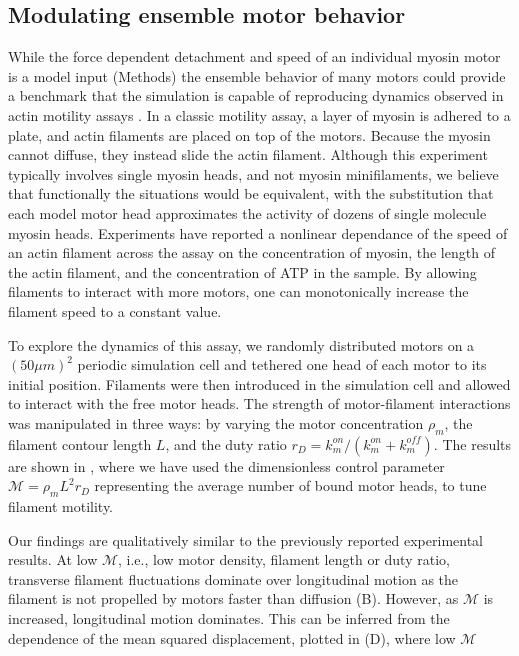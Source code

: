 \documentclass[12pt]{article}
\begin{document}
\subsection{Modulating ensemble motor behavior}
While the force dependent detachment and speed of an individual myosin motor is
a model input (Methods) the ensemble behavior of many motors could provide
a benchmark that the simulation is capable of reproducing dynamics observed in 
actin motility assays \cite{riveline1998, walcott2012}. In a classic motility
assay, a layer of myosin is adhered to a plate, and actin filaments
are placed on top of the motors. Because the myosin cannot diffuse, they
instead slide the actin filament. Although this experiment
typically involves single myosin heads, and not myosin minifilaments, we believe
that functionally the situations would be equivalent, with the substitution that
each model motor head approximates the activity of dozens of single molecule
myosin heads. Experiments have reported
a nonlinear dependance of the speed of an actin filament across the assay on the
concentration of myosin, the length of the actin filament, and the concentration
of ATP in the sample\cite{harris1993, umemoto1990}. By allowing filaments to interact with more motors, one
can monotonically increase the filament speed to a constant value.
\par
To explore the dynamics of this assay, we randomly distributed motors on a
$(50\mu m)^2$ periodic simulation cell and tethered one head of each motor to
its initial position. Filaments were then introduced in the simulation cell and 
allowed to interact with the free motor heads. The strength of motor-filament
interactions was manipulated in three ways: by varying the motor concentration
$\rho_m$, the filament contour length $L$, and the duty ratio $r_D =k_m^{on}/(k_m^{on}+k_m^{off})$. 
The results are shown in , where we have used the
dimensionless control parameter $\mathcal{M} = \rho_m L^2 r_D$ representing the
average number of bound motor heads, to tune filament motility.
\par
Our findings are qualitatively similar to the previously reported experimental 
results. At low $\mathcal{M}$, i.e., low motor density, filament length or duty
ratio, transverse filament fluctuations dominate over longitudinal motion as
the filament is not propelled by motors faster than diffusion
(B). However, as $\mathcal{M}$ is increased, longitudinal
motion dominates. This can be inferred from the dependence of the mean squared
displacement, plotted in (D), where low $\mathcal{M}$ 
\end{document}
